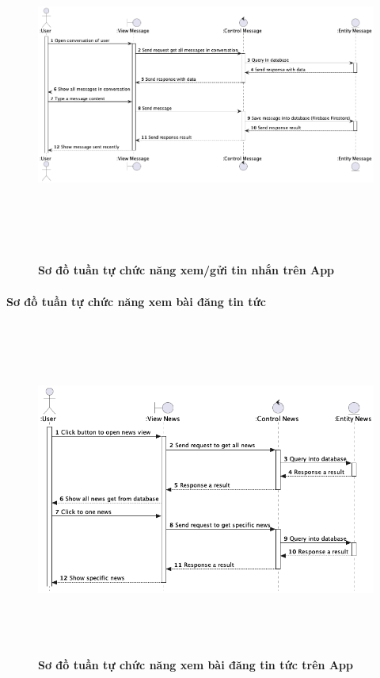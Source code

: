 \documentclass{article}%
\begin{document}
  \begin{figure}[H]
        \centering
        \includegraphics[width=16cm,height=11cm]{Images/mobile_app/send_and_receive_message.png}
        \caption[Sơ đồ tuần tự chức năng xem/gửi tin nhắn trên App]{\bfseries \fontsize{12pt}{0pt}
        \selectfont Sơ đồ tuần tự chức năng xem/gửi tin nhắn trên App}
        \label{hinh21} %
  \end{figure}


\paragraph{Sơ đồ tuần tự chức năng xem bài đăng tin tức}
\mbox{}

  \begin{figure}[H]
        \centering
        \includegraphics[width=16cm,height=11cm]{Images/mobile_app/view_news.png}
        \caption[ Sơ đồ tuần tự chức năng xem bài đăng tin tứctrên App]{\bfseries \fontsize{12pt}{0pt}
        \selectfont Sơ đồ tuần tự chức năng xem bài đăng tin tức trên App}
        \label{hinh21} %
  \end{figure}
\end{document}
